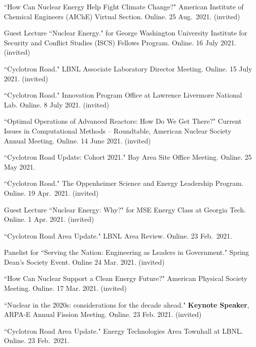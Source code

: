 \begin{bibsection}
\item ``How Can Nuclear Energy Help Fight Climate Change?" American Institute of Chemical Engineers (AIChE) Virtual Section. Online. 25 Aug.\ 2021. (invited)

\item Guest Lecture ``Nuclear Energy." for George Washington University Institute for Security and Conflict Studies (ISCS) Fellows Program. Online. 16 July 2021. (invited)

\item ``Cyclotron Road." LBNL Associate Laboratory Director Meeting. Online. 15 July 2021. (invited)

\item ``Cyclotron Road." Innovation Program Office at Lawrence Livermore National Lab. Online. 8 July 2021. (invited)

\item ``Optimal Operations of Advanced Reactors: How Do We Get There?" Current Issues in Computational Methods -- Roundtable, American Nuclear Society Annual Meeting. Online. 14 June 2021. (invited)

\item ``Cyclotron Road Update: Cohort 2021." Bay Area Site Office Meeting. Online. 25 May 2021.

\item ``Cyclotron Road." The Oppenheimer Science and Energy Leadership Program. Online. 19 Apr.\ 2021. (invited)

\item Guest Lecture ``Nuclear Energy: Why?" for MSE Energy Class at Georgia Tech. Online. 1 Apr. 2021. (invited)

\item ``Cyclotron Road Area Update." LBNL Area Review. Online. 23 Feb.\ 2021.

\item Panelist for ``Serving the Nation: Engineering as Leaders in Government." Spring Dean's Society Event. Online 24 Mar. 2021. (invited)

\item ``How Can Nuclear Support a Clean Energy Future?" American Physical Society Meeting. Online. 17 Mar. 2021. (invited)

\item ``Nuclear in the 2020s: considerations for the decade ahead." \textbf{Keynote Speaker}, ARPA-E Annual Fission Meeting. Online. 23 Feb. 2021. (invited)

\item ``Cyclotron Road Area Update." Energy Technologies Area Townhall at LBNL. Online. 23 Feb.\ 2021.


\end{bibsection}
